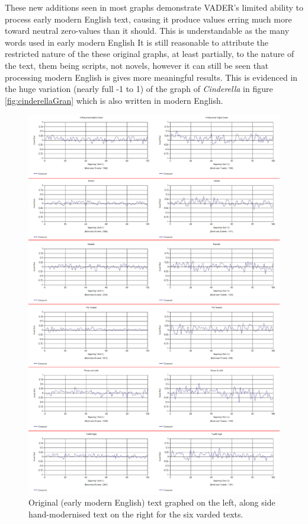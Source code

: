 \documentclass{article}
\begin{document}
        These new additions seen in most graphs demonstrate VADER's limited ability to process early modern English text, causing it produce values erring much more toward neutral zero-values than it should. This is understandable as the many words used in early modern English It is still reasonable to attribute the restricted nature of the these original graphs, at least partially, to the nature of the text, them being scripts, not novels, however it can still be seen that processing modern English is gives more meaningful results. This is evidenced in the huge variation (nearly full -1 to 1) of the graph of \textit{Cinderella} in figure \ref{fig:cinderellaGran} which is also written in modern English.
        \begin{figure}
            \includegraphics[width=1\textwidth]{Figures/EMvsM/EMvsMAll}
            \centering
            \caption{Original (early modern English) text graphed on the left, along side hand-modernised text on the right for the six varded texts.}
            \label{fig:emvsm}
        \end{figure}
\end{document}

